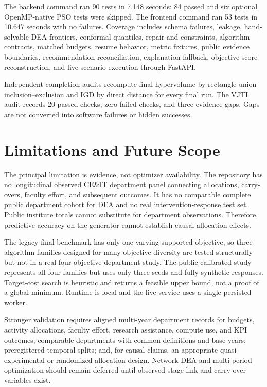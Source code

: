 \documentclass[12pt,a4paper]{report}
\begin{document}
The backend command ran 90 tests in 7.148 seconds: 84 passed and six optional OpenMP-native PSO tests were skipped. The frontend command ran 53 tests in 10.647 seconds with no failures. Coverage includes schema failures, leakage, hand-solvable DEA frontiers, conformal quantiles, repair and constraints, algorithm contracts, matched budgets, resume behavior, metric fixtures, public evidence boundaries, recommendation reconciliation, explanation fallback, objective-score reconstruction, and live scenario execution through FastAPI.

Independent completion audits recompute final hypervolume by rectangle-union inclusion--exclusion and IGD by direct distance for every final run. The VJTI audit records 20 passed checks, zero failed checks, and three evidence gaps. Gaps are not converted into software failures or hidden successes.

\chapter{Limitations and Future Scope}
The principal limitation is evidence, not optimizer availability. The repository has no longitudinal observed CE\&IT department panel connecting allocations, carry-overs, faculty effort, and subsequent outcomes. It has no comparable complete public department cohort for DEA and no real intervention-response test set. Public institute totals cannot substitute for department observations. Therefore, predictive accuracy on the generator cannot establish causal allocation effects.

The legacy final benchmark has only one varying supported objective, so three algorithm families designed for many-objective diversity are tested structurally but not in a real four-objective department study. The public-calibrated study represents all four families but uses only three seeds and fully synthetic responses. Target-cost search is heuristic and returns a feasible upper bound, not a proof of a global minimum. Runtime is local and the live service uses a single persisted worker.

Stronger validation requires aligned multi-year department records for budgets, activity allocations, faculty effort, research assistance, compute use, and KPI outcomes; comparable departments with common definitions and base years; preregistered temporal splits; and, for causal claims, an appropriate quasi-experimental or randomized allocation design. Network DEA and multi-period optimization should remain deferred until observed stage-link and carry-over variables exist.
\end{document}
